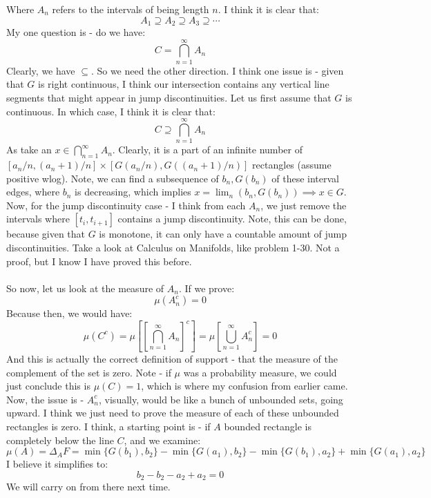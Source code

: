 \documentclass[12pt,a4paper]{article}
\newcommand{\1}[1]{\mathbbm{1}\left\{ #1 \right\}}
\begin{document}
Where $A_n$ refers to the intervals of being length $n$. I think it is clear that:
$$
	A_1 \supseteq A_2 \supseteq A_3 \supseteq \cdots
$$
My one question is - do we have:
$$
	C = \bigcap_{n=1}^\infty A_n
$$
Clearly, we have $\subseteq$. So we need the other direction. I think one issue is - given that $G$ is right continuous, I think our intersection contains any vertical line segments that might appear in jump discontinuities. Let us first assume that $G$ is continuous. In which case, I think it is clear that:
$$
	C \supseteq \bigcap_{n=1}^\infty A_n
$$
As take an $x \in \bigcap_{n=1}^\infty A_n$. Clearly, it is a part of an infinite number of $[a_n/n,(a_n+1)/n] \times  [G(a_n/n), G((a_n+1)/n)]$ rectangles (assume positive wlog). Note, we can find a subsequence of $b_n, G(b_n)$ of these interval edges, where $b_n$ is decreasing, which implies $x = \lim_n (b_n,G(b_n)) \implies x \in G$. Now, for the jump discontinuity case - I think from each $A_n$, we just remove the intervals where $[t_i,t_{i+1}]$ contains a jump discontinuity. Note, this can be done, because given that $G$ is monotone, it can only have a countable amount of jump discontinuities. Take a look at Calculus on Manifolds, like problem 1-30. Not a proof, but I know I have proved this before.
\\\\
So now, let us look at the measure of $A_n$. If we prove:
$$
	\mu(A_n^c) = 0
$$
Because then, we would have:
$$
	\mu(C^c) = \mu\left[\left[\bigcap_{n=1}^\infty A_n\right]^c\right] =
	\mu\left[\bigcup_{n=1}^\infty A_n^c\right] = 0
$$
And this is actually the correct definition of support - that the measure of the complement of the set is zero. Note - if $\mu$ was a probability measure, we could just conclude this is $\mu(C) = 1$, which is where my confusion from earlier came. Now, the issue is - $A_n^c$, visually, would be like a bunch of unbounded sets, going upward. I think we just need to prove the measure of each of these unbounded rectangles is zero. I think, a starting point is - if $A$ bounded rectangle is completely below the line $C$, and we examine:
$$
	\mu(A) = \Delta_AF =
	\min\{G(b_1),b_2\} - \min\{G(a_1),b_2\} - \min\{G(b_1),a_2\} + \min\{G(a_1),a_2\}
$$
I believe it simplifies to:
$$
	b_2 - b_2 - a_2 + a_2 = 0
$$
We will carry on from there next time.
\end{document}

